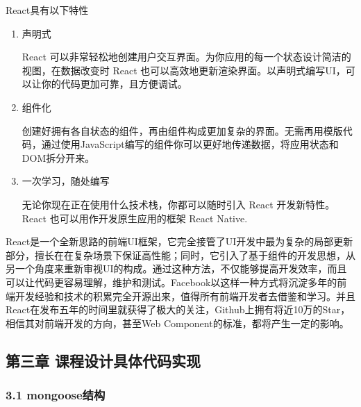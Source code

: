 \documentclass[]{article}
\begin{document}
React具有以下特性

\begin{enumerate}
\def\labelenumi{\arabic{enumi}.}
\item
  声明式

  React
  可以非常轻松地创建用户交互界面。为你应用的每一个状态设计简洁的视图，在数据改变时
  React
  也可以高效地更新渲染界面。以声明式编写UI，可以让你的代码更加可靠，且方便调试。
\item
  组件化

  创建好拥有各自状态的组件，再由组件构成更加复杂的界面。无需再用模版代码，通过使用JavaScript编写的组件你可以更好地传递数据，将应用状态和DOM拆分开来。
\item
  一次学习，随处编写

  无论你现在正在使用什么技术栈，你都可以随时引入 React 开发新特性。React
  也可以用作开发原生应用的框架 React Native.
\end{enumerate}


React是一个全新思路的前端UI框架，它完全接管了UI开发中最为复杂的局部更新部分，擅长在在复杂场景下保证高性能；同时，它引入了基于组件的开发思想，从另一个角度来重新审视UI的构成。通过这种方法，不仅能够提高开发效率，而且可以让代码更容易理解，维护和测试。Facebook以这样一种方式将沉淀多年的前端开发经验和技术的积累完全开源出来，值得所有前端开发者去借鉴和学习。并且React在发布五年的时间里就获得了极大的关注，Github上拥有将近10万的Star，相信其对前端开发的方向，甚至Web
Component的标准，都将产生一定的影响。

\hypertarget{header-n168}{%
\subsection{第三章 课程设计具体代码实现}\label{header-n168}}

\hypertarget{header-n169}{%
\subsubsection{3.1 mongoose结构}\label{header-n169}}
\end{document}
